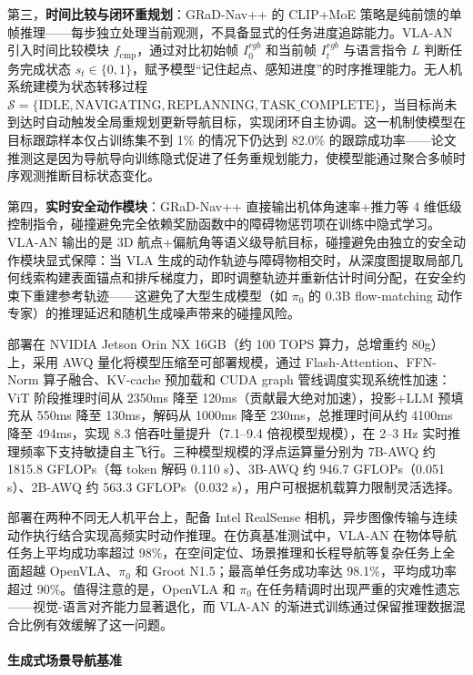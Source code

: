 第三，\textbf{时间比较与闭环重规划}：GRaD-Nav++ 的 CLIP+MoE 策略是纯前馈的单帧推理——每步独立处理当前观测，不具备显式的任务进度追踪能力。VLA-AN 引入时间比较模块 $f_{\text{cmp}}$，通过对比初始帧 $I_0^{rgb}$ 和当前帧 $I_t^{rgb}$ 与语言指令 $L$ 判断任务完成状态 $s_t \in \{0,1\}$，赋予模型``记住起点、感知进度''的时序推理能力。无人机系统建模为状态转移过程 $\mathcal{S}=\{\text{IDLE},\text{NAVIGATING},\text{REPLANNING},\text{TASK\_COMPLETE}\}$，当目标尚未到达时自动触发全局重规划更新导航目标，实现闭环自主协调。这一机制使模型在目标跟踪样本仅占训练集不到 1\% 的情况下仍达到 82.0\% 的跟踪成功率——论文推测这是因为导航导向训练隐式促进了任务重规划能力，使模型能通过聚合多帧时序观测推断目标状态变化。

第四，\textbf{实时安全动作模块}：GRaD-Nav++ 直接输出机体角速率+推力等 4 维低级控制指令，碰撞避免完全依赖奖励函数中的障碍物惩罚项在训练中隐式学习。VLA-AN 输出的是 3D 航点+偏航角等语义级导航目标，碰撞避免由独立的安全动作模块显式保障：当 VLA 生成的动作轨迹与障碍物相交时，从深度图提取局部几何线索构建表面锚点和排斥梯度力，即时调整轨迹并重新估计时间分配，在安全约束下重建参考轨迹——这避免了大型生成模型（如 $\pi_0$ 的 0.3B flow-matching 动作专家）的推理延迟和随机生成噪声带来的碰撞风险。

部署在 NVIDIA Jetson Orin NX 16GB（约 100 TOPS 算力，总增重约 80g）上，采用 AWQ 量化将模型压缩至可部署规模，通过 Flash-Attention、FFN-Norm 算子融合、KV-cache 预加载和 CUDA graph 管线调度实现系统性加速：ViT 阶段推理时间从 2350ms 降至 120ms（贡献最大绝对加速），投影+LLM 预填充从 550ms 降至 130ms，解码从 1000ms 降至 230ms，总推理时间从约 4100ms 降至 494ms，实现 8.3 倍吞吐量提升（7.1--9.4 倍视模型规模），在 2--3 Hz 实时推理频率下支持敏捷自主飞行。三种模型规模的浮点运算量分别为 7B-AWQ 约 1815.8 GFLOPs（每 token 解码 0.110 s）、3B-AWQ 约 946.7 GFLOPs（0.051 s）、2B-AWQ 约 563.3 GFLOPs（0.032 s），用户可根据机载算力限制灵活选择。

部署在两种不同无人机平台上，配备 Intel RealSense 相机，异步图像传输与连续动作执行结合实现高频实时动作推理。在仿真基准测试中，VLA-AN 在物体导航任务上平均成功率超过 98\%，在空间定位、场景推理和长程导航等复杂任务上全面超越 OpenVLA、$\pi_0$ 和 Groot N1.5；最高单任务成功率达 98.1\%，平均成功率超过 90\%。值得注意的是，OpenVLA 和 $\pi_0$ 在任务精调时出现严重的灾难性遗忘——视觉-语言对齐能力显著退化，而 VLA-AN 的渐进式训练通过保留推理数据混合比例有效缓解了这一问题。

\paragraph{生成式场景导航基准}

